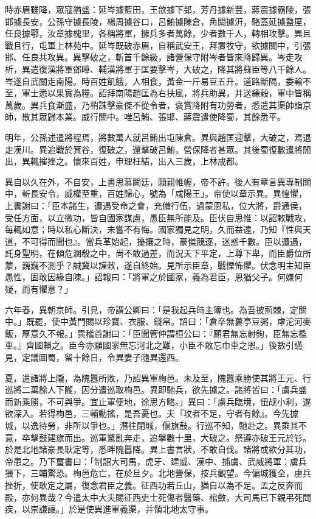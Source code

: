 \begin{pinyinscope}
時赤眉雖降，眾寇猶盛：延岑據藍田，王歆據下邽，芳丹據新豐，蔣震據霸陵，張邯據長安，公孫守據長陵，楊周據谷口，呂鮪據陳倉，角閎據汧，駱蓋延據盩厔，任良據鄠，汝章據槐里，各稱將軍，擁兵多者萬餘，少者數千人，轉相攻擊。異且戰且行，屯軍上林苑中。延岑既破赤眉，自稱武安王，拜置牧守，欲據關中，引張邯、任良共攻異。異擊破之，斬首千餘級，諸營保守附岑者皆來降歸異。岑走攻析，異遣復漢將軍鄧曄、輔漢將軍于匡要擊岑，大破之，降其將蘇臣等八千餘人。岑遂自武關走南陽。時百姓飢餓，人相食，黃金一斤易豆五升。道路斷隔，委輸不至，軍士悉以果實為糧。詔拜南陽趙匡為右扶風，將兵助異，并送縑穀，軍中皆稱萬歲。異兵食漸盛，乃稍誅擊豪傑不從令者，褒賞降附有功勞者，悉遣其渠帥詣京師，散其眾歸本業。威行關中。唯呂鮪、張邯、蔣震遣使降蜀，其餘悉平。

明年，公孫述遣將程焉，將數萬人就呂鮪出屯陳倉。異與趙匡迎擊，大破之，焉退走漢川。異追戰於箕谷，復破之，還擊破呂鮪，營保降者甚眾。其後蜀復數遣將閒出，異輒摧挫之。懷來百姓，申理枉結，出入三歲，上林成都。

異自以久在外，不自安，上書思慕闕廷，願親帷幄，帝不許。後人有章言異專制關中，斬長安令，威權至重，百姓歸心，號為「咸陽王」。帝使以章示異。異惶懼，上書謝曰：「臣本諸生，遭遇受命之會，充備行伍，過蒙恩私，位大將，爵通侯，受任方面，以立微功，皆自國家謀慮，愚臣無所能及。臣伏自思惟：以詔敕戰攻，每輒如意；時以私心斷決，未嘗不有悔。國家獨見之明，久而益遠，乃知『性與天道，不可得而聞也』。當兵革始起，擾攘之時，豪傑競逐，迷惑千數。臣以遭遇，託身聖明，在傾危溷殽之中，尚不敢過差，而況天下平定，上尊下卑，而臣爵位所蒙，巍巍不測乎？誠冀以謹敕，遂自終始。見所示臣章，戰慄怖懼。伏念明主知臣愚性，固敢因緣自陳。」詔報曰：「將軍之於國家，義為君臣，恩猶父子。何嫌何疑，而有懼意？」

六年春，異朝京師。引見，帝謂公卿曰：「是我起兵時主簿也。為吾披荊棘，定關中。」既罷，使中黃門賜以珍寶、衣服、錢帛。詔曰：「倉卒無蔞亭豆粥，虖沱河麥飯，厚意久不報。」異稽首謝曰：「臣聞管仲謂桓公曰：『願君無忘射鉤，臣無忘檻車。』齊國賴之。臣今亦願國家無忘河北之難，小臣不敢忘巾車之恩。」後數引讌見，定議圖蜀，留十餘日，令異妻子隨異還西。

夏，遣諸將上隴，為隗囂所敗，乃詔異軍栒邑。未及至，隗囂乘勝使其將王元、行巡將二萬餘人下隴，因分遣巡取栒邑。異即馳兵，欲先據之。諸將皆曰：「虜兵盛而新乘勝，不可與爭。宜止軍便地，徐思方略。」異曰：「虜兵臨境，忸觇小利，遂欲深入。若得栒邑，三輔動搖，是吾憂也。夫『攻者不足，守者有餘』。今先據城，以逸待勞，非所以爭也。」潛往閉城，偃旗鼓。行巡不知，馳赴之。異乘其不意，卒擊鼓建旗而出。巡軍驚亂奔走，追搫數十里，大破之。祭遵亦破王元於钐。於是北地諸豪長耿定等，悉畔隗囂降。異上書言狀，不敢自伐。諸將或欲分其功，帝患之。乃下璽書曰：「制詔大司馬，虎牙、建威、漢中、捕虜、武威將軍：虜兵猥下，三輔驚恐。栒邑危亡，在於旦夕。北地營保，按兵觀望。今偏城獲全，虜兵挫折，使耿定之屬，復念君臣之義。征西功若丘山，猶自以為不足。孟之反奔而殿，亦何異哉？今遣太中大夫賜征西吏士死傷者醫藥、棺斂，大司馬已下親弔死問疾，以崇謙讓。」於是使異進軍義渠，并領北地太守事。


\end{pinyinscope}
